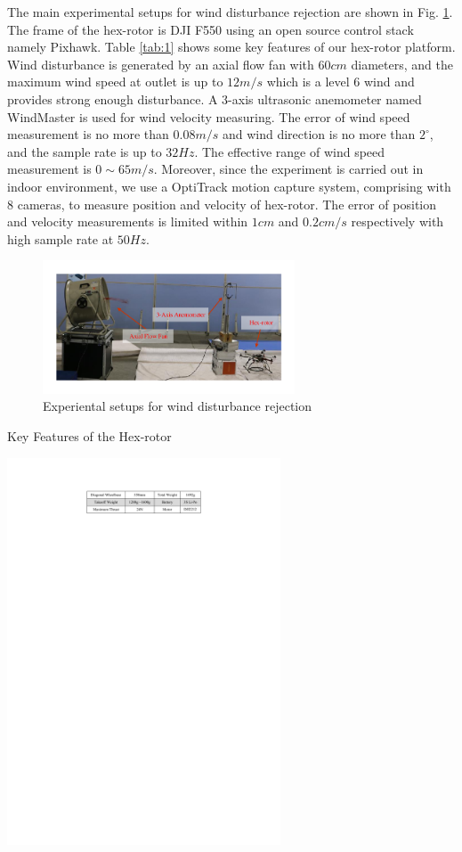 \documentclass[letterpaper, 10 pt, conference]{ieeeconf}  %
\begin{document}
The main experimental setups for wind disturbance rejection are shown in Fig. \ref{f7}.
The frame of the hex-rotor is DJI F550 using an open source control stack namely Pixhawk.
Table \ref{tab:1} shows some key features of our hex-rotor platform.
Wind disturbance is generated by an axial flow fan with $60cm$ diameters, and the maximum wind speed at outlet is up to $12m/s$ which is a level 6 wind and provides strong enough disturbance.
A 3-axis ultrasonic anemometer named WindMaster is used for wind velocity measuring.
The error of wind speed measurement is no more than $0.08m/s$ and wind direction is no more than $2^\circ$, and the sample rate is up to $32Hz$.
The effective range of wind speed measurement is $0\sim 65m/s$.
Moreover, since the experiment is carried out in indoor environment, we use a OptiTrack motion capture system, comprising with 8 cameras, to measure position and velocity of hex-rotor.
The error of position and velocity measurements is limited within $1cm$ and $0.2cm/s$ respectively with high sample rate at $50Hz$.
\begin{figure}[t]
    \centering
    \includegraphics[width=2.95in]{illustrations/fig7.pdf}
    \caption{Experiental setups for wind disturbance rejection}
    \label{f7}
\end{figure}
\begin{table}[h]
    \centering
    \caption{Key Features of the Hex-rotor}
    \includegraphics[width=3.2in]{illustrations/tab1.pdf}
    \label{tab:1}
\end{table}
\end{document}
